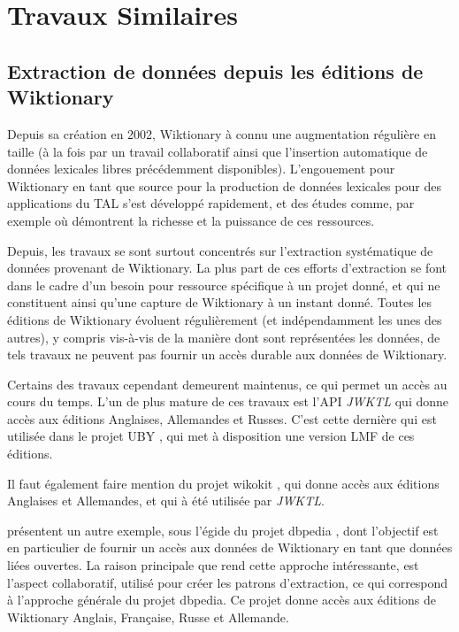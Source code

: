 \documentclass[10pt,a4paper,twoside]{article}
\begin{document}
\section{Travaux Similaires}

\subsection{Extraction de données depuis les éditions de Wiktionary} Depuis sa création en 2002, Wiktionary à connu une augmentation régulière en taille (à la fois par un travail collaboratif ainsi que l'insertion automatique de données lexicales libres précédemment disponibles). L'engouement pour Wiktionary en tant que source pour la production de données lexicales pour des applications du TAL s'est développé rapidement, et des études comme, par exemple \cite{Zesch:AAAI2008} où \cite{navarro-EtAl:2009:PeoplesWeb} démontrent la richesse et la puissance de ces ressources.

Depuis, les travaux se sont surtout concentrés sur l'extraction systématique de données provenant de Wiktionary.  La plus part de ces efforts d'extraction se font dans le cadre d'un  besoin pour ressource spécifique à un projet donné, et qui ne constituent ainsi qu'une capture de Wiktionary à un instant donné. Toutes les éditions de Wiktionary évoluent régulièrement (et indépendamment les unes des autres), y compris vis-à-vis de la manière dont sont représentées les données, de tels travaux ne peuvent pas fournir un accès durable aux données de Wiktionary.


Certains des travaux cependant demeurent maintenus, ce qui permet un accès au cours du temps. L'un de plus mature de ces travaux est l'API \emph{JWKTL} \cite{ZeschMuellerGurevych2008} qui donne accès aux éditions Anglaises, Allemandes et Russes. C'est cette dernière qui est utilisée dans le projet UBY \cite{gurevych2012uby}, qui met à disposition une version LMF de ces éditions.

Il faut également faire mention du projet wikokit \cite{krizhanovsky2010transformation}, qui donne accès  aux éditions Anglaises et Allemandes, et qui à été utilisée par \emph{JWKTL}.

\cite{HellmannSebastianandBrekleJonasandAuer} présentent un autre exemple, sous l'égide du projet dbpedia  \cite{dbpedia-swj}, dont l'objectif est en particulier de fournir un accès aux données de Wiktionary en tant que données liées ouvertes. La raison principale que rend cette approche intéressante, est l'aspect collaboratif, utilisé pour créer les patrons d'extraction, ce qui correspond à l'approche générale du projet dbpedia. Ce projet donne accès aux éditions de Wiktionary Anglais, Française, Russe et Allemande.
\end{document}
